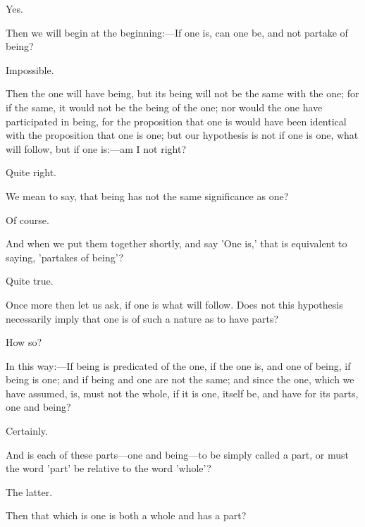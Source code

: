 \documentclass[11pt,letter]{article}
\begin{document}
\par  Yes.

\par  Then we will begin at the beginning:—If one is, can one be, and not partake of being?

\par  Impossible.

\par  Then the one will have being, but its being will not be the same with the one; for if the same, it would not be the being of the one; nor would the one have participated in being, for the proposition that one is would have been identical with the proposition that one is one; but our hypothesis is not if one is one, what will follow, but if one is:—am I not right?

\par  Quite right.

\par  We mean to say, that being has not the same significance as one?

\par  Of course.

\par  And when we put them together shortly, and say 'One is,' that is equivalent to saying, 'partakes of being'?

\par  Quite true.

\par  Once more then let us ask, if one is what will follow. Does not this hypothesis necessarily imply that one is of such a nature as to have parts?

\par  How so?

\par  In this way:—If being is predicated of the one, if the one is, and one of being, if being is one; and if being and one are not the same; and since the one, which we have assumed, is, must not the whole, if it is one, itself be, and have for its parts, one and being?

\par  Certainly.

\par  And is each of these parts—one and being—to be simply called a part, or must the word 'part' be relative to the word 'whole'?

\par  The latter.

\par  Then that which is one is both a whole and has a part?
\end{document}
